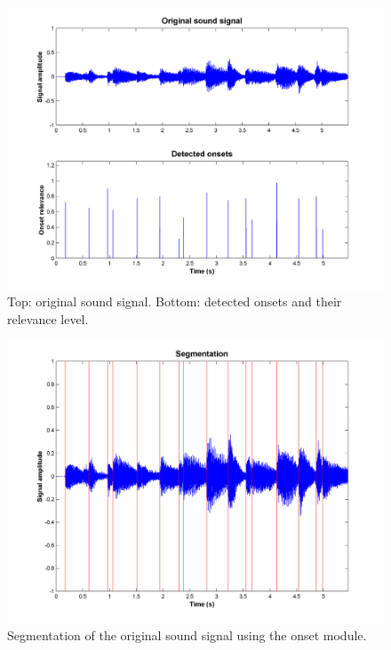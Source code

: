 \begin{figure}[h]
    \centering
    \includegraphics[width=\IPEMDefaultFigureWidth]{Graphics/OnsetsOnsetFilter}
    \caption{Top: original sound signal. Bottom: detected onsets and their relevance level.}
    \label{Fig:OnsetsOnsetFilter}
\end{figure}

\begin{figure}[h]
    \centering
    \includegraphics[width=\IPEMDefaultFigureWidth]{Graphics/OnsetsSegmentation}
    \caption{Segmentation of the original sound signal using the onset module.}
    \label{Fig:OnsetsSegmentation}
\end{figure}

